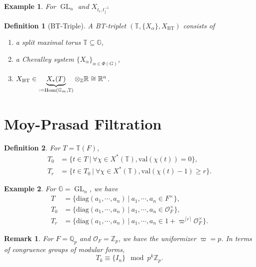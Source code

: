 \documentclass[10pt]{article}
\newtheorem{definition}{Definition}[section]
\newtheorem{remark}{Remark}[section]
\newtheorem{example}{Example}[section]
\numberwithin{equation}{theorem}
\DeclareMathOperator{\GL}{GL}
\DeclareMathOperator{\Hom}{Hom}
\newcommand{\defeq}{\vcentcolon=}
\newcommand{\bR}[0]{\mathbb{R}}
\newcommand{\Ouv}[0]{\mathcal{O}}
\newcommand{\Z}[0]{\mathbb{Z}}
\newcommand{\bQ}[0]{\mathbb{Q}}
\newcommand{\G}[0]{\mathbb{G}}
\newcommand{\bT}[0]{\mathbb{T}}
\newcommand{\diag}[0]{\mathrm{diag}}
\newcommand{\sep}[0]{\:|\:}
\newcommand{\tens}[1]{%
  \mathbin{\mathop{\otimes}\displaylimits_{#1}}%
}
\begin{document}
\begin{example}
    For $\GL_n$ and $X_{t_i,t_j^{-1}}$ %
\end{example}

\begin{definition}[BT-Triple]
    A BT-triplet $(\mathbb{T},\{X_\alpha\},X_{\mathrm{BT}})$ consists of
    \begin{enumerate}
        \item a split maximal torus $\mathbb{T}\subseteq\G$,
        \item a Chevalley system $\{X_\alpha\}_{\alpha\in\Phi(G)}$,
        \item $X_\mathrm{BT}\in \underbrace{X_*(T)}_{\defeq \Hom(\G_m,\mathbb{T})}\tens{\Z} \bR\cong \bR^n$.
    \end{enumerate}
\end{definition}


\section{Moy-Prasad Filtration}

\begin{definition}
    For $T=\bT(F)$, 
    \begin{align*}
        T_0 &= \{t\in T\sep \forall \chi\in X^*(\bT), \mathrm{val}(\chi(t))=0\},\\
        T_r &= \{t\in T_0\sep\forall \chi\in X^*(\bT), \mathrm{val}(\chi(t)-1)\geq r\}.
    \end{align*}
\end{definition}

\begin{example}
    For $\G=\GL_n$, we have
    \begin{align*}
        T &= \{\diag(a_1,\cdots,a_n)\sep a_1,\cdots,a_n\in F^\times\},\\
        T_0 &= \{\diag(a_1,\cdots,a_n)\sep a_1,\cdots,a_n\in\Ouv_F^\times\},\\
        T_r & = \{\diag(a_1,\cdots,a_n)\sep a_1,\cdots,a_n\in1+\varpi^{\lceil r\rceil}\Ouv_F^\times\}.
    \end{align*}
\end{example}

\begin{remark}
    For $F=\bQ_p$ and $\Ouv_F = \Z_p$, we have the uniformizer $\varpi=p$. In terms of congruence groups of modular forms,
    \begin{equation*}
        T_k \equiv \{I_n\}\mod{p^k\Z_p}.
    \end{equation*}
\end{remark}
\end{document}
